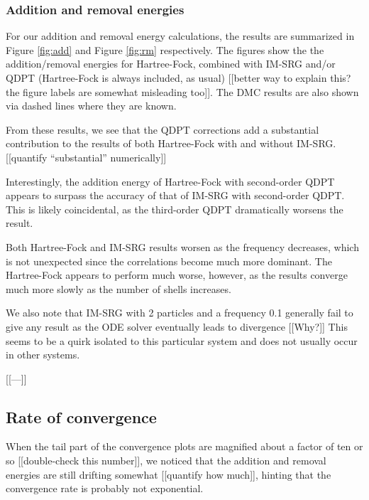 \subsubsection{Addition and removal energies}

For our addition and removal energy calculations, the results are summarized in Figure \ref{fig:add} and Figure \ref{fig:rm} respectively.  The figures show the the addition/removal energies for Hartree-Fock, combined with IM-SRG and/or QDPT (Hartree-Fock is always included, as usual) [[better way to explain this? the figure labels are somewhat misleading too]].  The DMC results are also shown via dashed lines where they are known.

From these results, we see that the QDPT corrections add a substantial contribution to the results of both Hartree-Fock with and without IM-SRG.  [[quantify ``substantial'' numerically]]

Interestingly, the addition energy of Hartree-Fock with second-order QDPT appears to surpass the accuracy of that of IM-SRG with second-order QDPT.  This is likely coincidental, as the third-order QDPT dramatically worsens the result.

Both Hartree-Fock and IM-SRG results worsen as the frequency decreases, which is not unexpected since the correlations become much more dominant.  The Hartree-Fock appears to perform much worse, however, as the results converge much more slowly as the number of shells increases.

We also note that IM-SRG with 2 particles and a frequency 0.1 generally fail to give any result as the ODE solver eventually leads to divergence [[Why?]]  This seems to be a quirk isolated to this particular system and does not usually occur in other systems.

[[---]]

\subsection{Rate of convergence}

When the tail part of the convergence plots are magnified about a factor of ten or so [[double-check this number]], we noticed that the addition and removal energies are still drifting somewhat [[quantify how much]], hinting that the convergence rate is probably not exponential.

